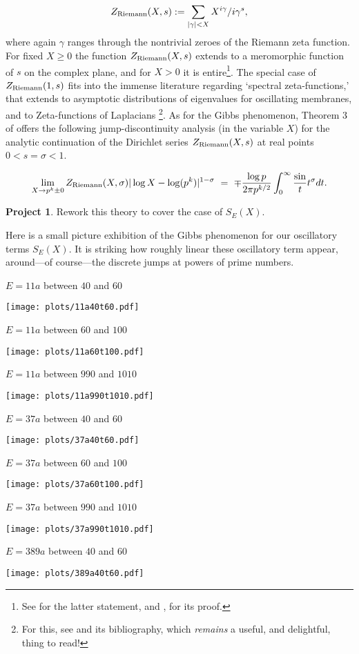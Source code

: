 \documentclass[11pt]{article}
\theoremstyle{plain}
\theoremstyle{definition}
\newtheorem{project}[theorem]{Project}
\numberwithin{equation}{section}
\numberwithin{figure}{section}
\numberwithin{table}{section}
\begin{document}
 $$Z_{\rm Riemann}(X,s): =   \sum_{|\gamma|<X}X^{i\gamma}/i\gamma^s,$$ where again $\gamma$ ranges through the nontrivial zeroes of the Riemann zeta function.  For fixed $X\ge 0$ the function $Z_{\rm Riemann}(X,s)$ extends to a meromorphic function of $s$ on the  complex plane, and for $X>0$ it is entire{\footnote{ See \cite{Fu3} for the latter statement, and \cite{Fu1}, \cite{Fu2} for its proof.\vskip10pt}}.  The special case of $Z_{\rm Riemann}(1,s)$  fits into the immense literature regarding `spectral zeta-functions,' that extends to asymptotic
distributions of eigenvalues for oscillating membranes, and  to Zeta-functions of Laplacians {\footnote{ For this, see \cite{W} and its bibliography, which {\it remains} a useful, and delightful,   thing to read!}}. As for the Gibbs phenomenon, Theorem 3 of \cite{Fu3} offers the following jump-discontinuity analysis (in the variable $X$) for the analytic continuation of the Dirichlet series $Z_{\rm Riemann}(X,s)$ at real points $0 < s = \sigma < 1$.

 $$\lim_{X \to p^k\pm 0}{{Z_{\rm Riemann}(X,\sigma)}{|\log X -\log(p^k)|^{1-\sigma}} \ = \ \mp {\frac{\log p}{2\pi p^{k/2}}}\int_0^{\infty}{\frac \sin t}{t^{\sigma}}}dt.$$
 \vskip10pt
 \begin{project} Rework this theory to cover the case of $S_E(X)$.\end{project}
  \vskip10pt
  Here is a small picture exhibition of the Gibbs phenomenon for our oscillatory terms $S_E(X)$.  It is striking how roughly linear these oscillatory term appear, around---of course---the discrete jumps at powers of prime numbers.
 \vskip10pt

 \centerline{ $E = 11a$  between $40$ and $60$}
   \vskip10pt
 \hskip100pt \texttt{[image: plots/11a40t60.pdf]}
    \newpage
  \centerline{ $E = 11a$  between $60$ and $100$}
   \vskip10pt
 \hskip100pt \texttt{[image: plots/11a60t100.pdf]}

   \vskip10pt
   \centerline{ $E = 11a$  between $990$ and $1010$}
   \vskip10pt
 \hskip100pt \texttt{[image: plots/11a990t1010.pdf]}

 \newpage
   \centerline{ $E = 37a$  between $40$ and $60$}

   \vskip10pt
 \hskip100pt \texttt{[image: plots/37a40t60.pdf]}

   \centerline{ $E = 37a$  between $60$ and $100$}
   \vskip10pt
 \hskip100pt \texttt{[image: plots/37a60t100.pdf]}
 \newpage
  \centerline{ $E = 37a$  between $990$ and $1010$}
   \vskip10pt
 \hskip100pt \texttt{[image: plots/37a990t1010.pdf]}
 \newpage
  \centerline{ $E = 389a$  between $40$ and $60$}
   \vskip10pt
 \hskip100pt \texttt{[image: plots/389a40t60.pdf]}
\end{document}
